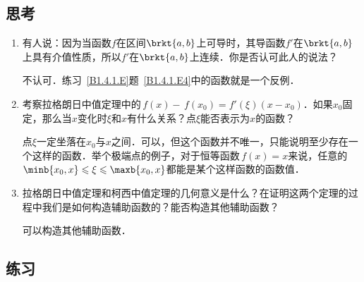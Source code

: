 \subsection*{思考}

\begin{enumerate}
\item 有人说：因为当函数\(f\)在区间\(\brkt{a,b}\)上可导时，其导函数\(f'\)在\(\brkt{a,b}\)上具有介值性质，所以\(f'\)在\(\brkt{a,b}\)上连续．你是否认可此人的说法？

  \ifshowsolp
    不认可．练习~\ref{B1.4.1.E}题~\ref{B1.4.1.E4}中的函数就是一个反例．
  \fi

\item 考察拉格朗日中值定理中的\(\,f(x) - \,f(x_0) = f'(\xi)(x - x_0)\)．如果\(x_0\)固定，那么当\(x\)变化时\(\xi\)和\(x\)有什么关系？点\(\xi\)能否表示为\(x\)的函数？

  \ifshowsolp
    点\(\xi\)一定坐落在\(x_0\)与\(x\)之间．可以，但这个函数并不唯一，只能说明至少存在一个这样的函数．举个极端点的例子，对于恒等函数\(\,f(x) = x\)来说，任意的\(\minb{x_0, x} \le \xi \le \maxb{x_0, x}\)都能是某个这样函数的函数值．
  \fi

\item 拉格朗日中值定理和柯西中值定理的几何意义是什么？在证明这两个定理的过程中我们是如何构造辅助函数的？能否构造其他辅助函数？

  \ifshowsolp
    可以构造其他辅助函数．
  \fi
\end{enumerate}

\ifshowex
{}
\subsection*{练习}

